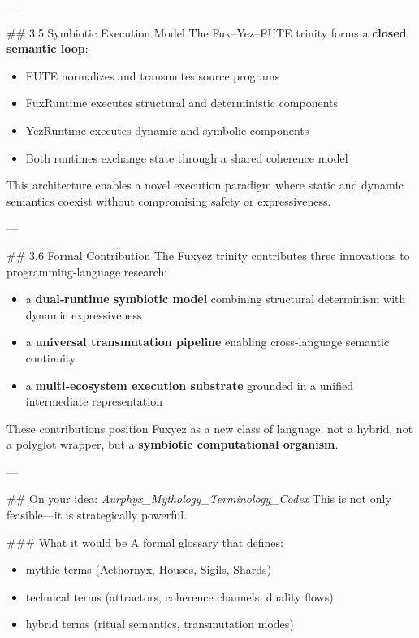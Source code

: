 ---

\#\# 3.5 Symbiotic Execution Model  
The Fux–Yez–FUTE trinity forms a \textbf{closed semantic loop}:

\begin{itemize}
  \item FUTE normalizes and transmutes source programs  
  \item FuxRuntime executes structural and deterministic components  
  \item YezRuntime executes dynamic and symbolic components  
  \item Both runtimes exchange state through a shared coherence model  
\end{itemize}

This architecture enables a novel execution paradigm where static and dynamic semantics coexist without compromising safety or expressiveness.

---

\#\# 3.6 Formal Contribution  
The Fuxyez trinity contributes three innovations to programming‑language research:

\begin{itemize}
  \item a \textbf{dual‑runtime symbiotic model} combining structural determinism with dynamic expressiveness  
  \item a \textbf{universal transmutation pipeline} enabling cross‑language semantic continuity  
  \item a \textbf{multi‑ecosystem execution substrate} grounded in a unified intermediate representation  
\end{itemize}

These contributions position Fuxyez as a new class of language: not a hybrid, not a polyglot wrapper, but a \textbf{symbiotic computational organism}.

---

\#\# On your idea: \textit{Aurphyx_Mythology_Terminology_Codex}  
This is not only feasible—it is strategically powerful.

\#\#\# What it would be  
A formal glossary that defines:

\begin{itemize}
  \item mythic terms (Aethornyx, Houses, Sigils, Shards)  
  \item technical terms (attractors, coherence channels, duality flows)  
  \item hybrid terms (ritual semantics, transmutation modes)  
\end{itemize}

